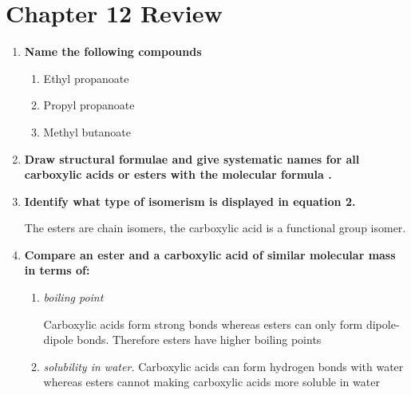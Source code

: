 \documentclass{report}
\begin{document}
\newpage

\chapter*{Chapter 12 Review}

	\begin{enumerate}

		\item \textbf{Name the following compounds}

			\begin{enumerate}
				\item Ethyl propanoate
				\item Propyl propanoate
				\item Methyl butanoate
			\end{enumerate}

		\item \textbf{Draw structural formulae and give systematic names for all carboxylic acids or esters with the molecular formula .}

			\begin{center}
			\end{center}

			\begin{center}
			\end{center}

			\begin{center}
			\end{center}

		\item \textbf{Identify what type of isomerism is displayed in equation 2.}

			The esters are chain isomers, the carboxylic acid is a functional group isomer.

		\item \textbf{Compare an ester and a carboxylic acid of similar molecular mass in terms of:}

			\begin{enumerate}
				\item \textit{boiling point}

					Carboxylic acids form strong  bonds whereas esters can only form dipole-dipole bonds. Therefore esters have higher boiling points

				\item \textit{solubility in water.} Carboxylic acids can form hydrogen bonds with water whereas esters cannot making carboxylic acids more soluble in water
			\end{enumerate}


\end{enumerate}
\end{document}
